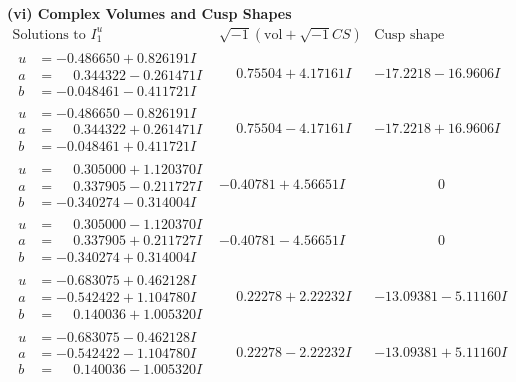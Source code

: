 \documentclass[1p]{elsarticle_modified}
\theoremstyle{definition}
\newcommand{\I}{\sqrt{-1}}
\begin{document}
\newpage\flushleft \textbf{(vi) Complex Volumes and Cusp Shapes}
$$\begin{array}{c|c|c}  
\text{Solutions to }I^u_{1}& \I (\text{vol} + \sqrt{-1}CS) & \text{Cusp shape}\\
 \hline 
\begin{aligned}
u &= -0.486650 + 0.826191 I \\
a &= \phantom{-}0.344322 - 0.261471 I \\
b &= -0.048461 - 0.411721 I\end{aligned}
 & \phantom{-}0.75504 + 4.17161 I & -17.2218 - 16.9606 I \\ \hline\begin{aligned}
u &= -0.486650 - 0.826191 I \\
a &= \phantom{-}0.344322 + 0.261471 I \\
b &= -0.048461 + 0.411721 I\end{aligned}
 & \phantom{-}0.75504 - 4.17161 I & -17.2218 + 16.9606 I \\ \hline\begin{aligned}
u &= \phantom{-}0.305000 + 1.120370 I \\
a &= \phantom{-}0.337905 - 0.211727 I \\
b &= -0.340274 - 0.314004 I\end{aligned}
 & -0.40781 + 4.56651 I & \phantom{-0.000000 } 0 \\ \hline\begin{aligned}
u &= \phantom{-}0.305000 - 1.120370 I \\
a &= \phantom{-}0.337905 + 0.211727 I \\
b &= -0.340274 + 0.314004 I\end{aligned}
 & -0.40781 - 4.56651 I & \phantom{-0.000000 } 0 \\ \hline\begin{aligned}
u &= -0.683075 + 0.462128 I \\
a &= -0.542422 + 1.104780 I \\
b &= \phantom{-}0.140036 + 1.005320 I\end{aligned}
 & \phantom{-}0.22278 + 2.22232 I & -13.09381 - 5.11160 I \\ \hline\begin{aligned}
u &= -0.683075 - 0.462128 I \\
a &= -0.542422 - 1.104780 I \\
b &= \phantom{-}0.140036 - 1.005320 I\end{aligned}
 & \phantom{-}0.22278 - 2.22232 I & -13.09381 + 5.11160 I \\ \hline\begin{aligned}

\end{aligned}
\end{array}$$
\end{document}
